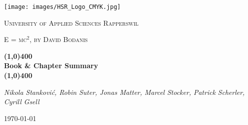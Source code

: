 \documentclass[a4paper,12pt,parskip]{scrreprt}
\newcommand{\documentauthors}{Nikola Stanković, Robin Suter, Jonas Matter, Marcel Stocker, Patrick Scherler, Cyrill Gsell}
\newcommand{\documenttitel}{E = mc$^2$, by David Bodanis}
\newcommand{\documentsubtitel}{Book \& Chapter Summary}
\begin{document}
\author{
  Stanković, Nikola
  \and
  Suter, Robin
  \and
  Matter, Jonas
  \and
  Stocker, Marcel
  \and
  Scherler, Patrick
  \and
  Gsell, Cyrill
}

\begin{titlepage}
	\centering
	\texttt{[image: images/HSR\_Logo\_CMYK.jpg]}\par\vspace{1cm}
	{\scshape\LARGE University of Applied Sciences Rapperswil \par}
	\vspace{1cm}
	{\scshape\Large \documenttitel \par}
	\vspace{0.5cm}
	{\huge\bfseries \line(1,0){400} \\ \documentsubtitel \\ \line(1,0){400} \par}
	\vspace{2cm}
	{\Large\itshape \documentauthors \par}

	\vfill

	{\large \today\par}
\end{titlepage}

\tableofcontents








\end{document}
